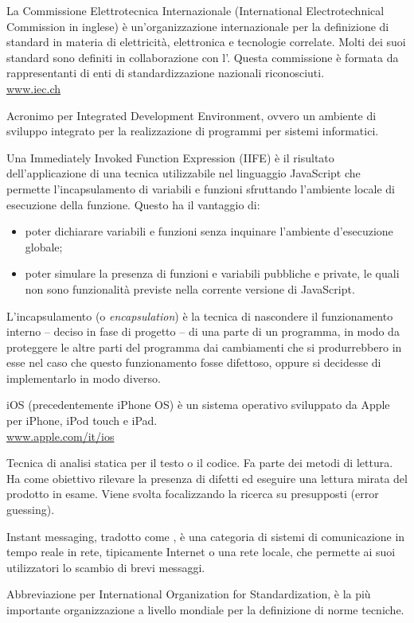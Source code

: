 La Commissione Elettrotecnica Internazionale (International Electrotechnical Commission in inglese) è un'organizzazione internazionale per la definizione di standard in materia di elettricità, elettronica e tecnologie correlate. Molti dei suoi standard sono definiti in collaborazione con l'. Questa commissione è formata da rappresentanti di enti di standardizzazione nazionali riconosciuti.\\
\url{www.iec.ch}

Acronimo per Integrated Development Environment, ovvero un ambiente di sviluppo integrato per la realizzazione di programmi per sistemi informatici.

Una Immediately Invoked Function Expression (IIFE) è il risultato dell'applicazione di una tecnica utilizzabile nel linguaggio JavaScript che permette l'incapsulamento di variabili e funzioni sfruttando l'ambiente locale di esecuzione della funzione. Questo ha il vantaggio di:
\begin{itemize}
  \item poter dichiarare variabili e funzioni senza inquinare l'ambiente d'esecuzione globale; 
  \item poter simulare la presenza di funzioni e variabili pubbliche e private, le quali non sono funzionalità previste nella corrente versione di JavaScript.
\end{itemize}

L'incapsulamento (o \textit{encapsulation}) è la tecnica di nascondere il funzionamento interno – deciso in fase di progetto – di una parte di un programma, in modo da proteggere le altre parti del programma dai cambiamenti che si produrrebbero in esse nel caso che questo funzionamento fosse difettoso, oppure si decidesse di implementarlo in modo diverso.

iOS (precedentemente iPhone OS) è un sistema operativo sviluppato da Apple per iPhone, iPod touch e iPad.\\
\url{www.apple.com/it/ios}

Tecnica di analisi statica per il testo o il codice. Fa parte dei metodi di lettura. Ha come obiettivo rilevare la presenza di difetti ed eseguire una lettura mirata del prodotto in esame. Viene svolta focalizzando la ricerca su presupposti (error guessing).

Instant messaging, tradotto come , è una categoria di sistemi di comunicazione in tempo reale in rete, tipicamente Internet o una rete locale, che permette ai suoi utilizzatori lo scambio di brevi messaggi.

Abbreviazione per International Organization for Standardization, è la più importante organizzazione a livello mondiale per la definizione di norme tecniche.
\clearpage
